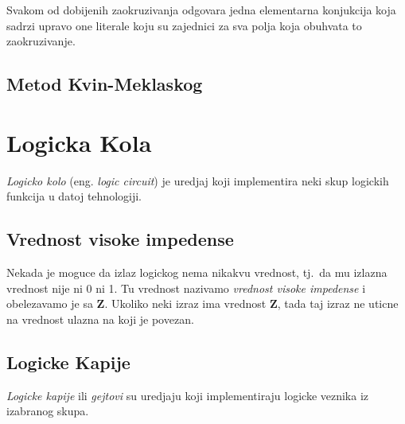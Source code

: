 \documentclass[12p,a4paper]{article}
\begin{document}
\begin{multicols}{2}
    Svakom od dobijenih zaokruzivanja odgovara jedna elementarna konjukcija
    koja sadrzi upravo one literale koju su zajednici za sva polja koja 
    obuhvata to zaokruzivanje.

    \subsection{Metod Kvin-Meklaskog}
    
    \section{Logicka Kola}
    
    \emph{Logicko kolo} (eng. \emph{logic circuit}) je uredjaj koji 
    implementira neki skup logickih funkcija u datoj tehnologiji.

    \subsection{Vrednost visoke impedense}
    
    Nekada je moguce da izlaz logickog nema nikakvu vrednost, tj.\ da mu
    izlazna vrednost nije ni 0 ni 1. Tu vrednost nazivamo 
    \emph{vrednost visoke impedense} i obelezavamo je sa $\mathbf{Z}$. Ukoliko
    neki izraz ima vrednost $\mathbf{Z}$, tada taj izraz ne uticne na vrednost 
    ulazna na koji je povezan.

    \subsection{Logicke Kapije}

    \emph{Logicke kapije} ili \emph{gejtovi} su uredjaju koji implementiraju 
    logicke veznika iz izabranog skupa.


\end{multicols}
\end{document}
